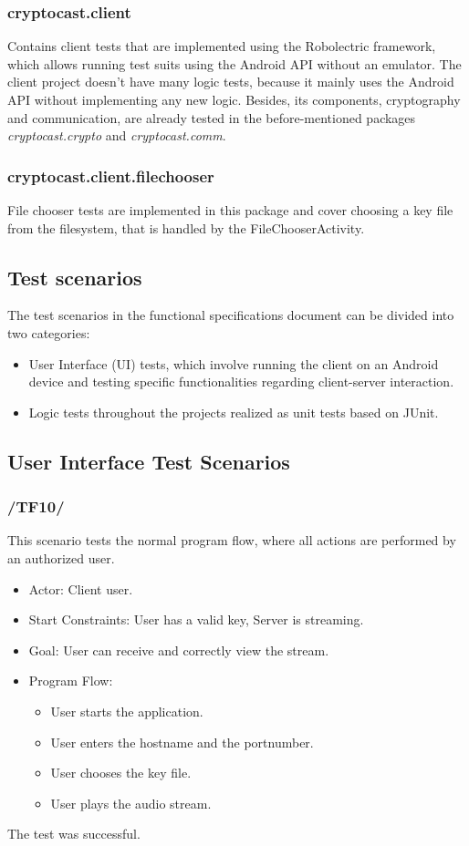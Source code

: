 \documentclass[a4paper,10pt]{scrartcl}
\begin{document}
\subsubsection{cryptocast.client}
Contains client tests that are implemented using the Robolectric framework, which allows running test suits using the Android API without an emulator. The client project doesn't have many logic tests, because it mainly uses the Android API without implementing any new logic. Besides, its components, cryptography and communication, are already tested in the before-mentioned packages \textit{cryptocast.crypto} and \textit{cryptocast.comm}.

\subsubsection{cryptocast.client.filechooser}
File chooser tests are implemented in this package and cover choosing a key file from the filesystem, that is handled by the FileChooserActivity.


\subsection{Test scenarios}
The test scenarios in the functional specifications document can be divided into two categories:

\begin{itemize}
	\item User Interface (UI) tests, which involve running the client on an Android device and testing specific functionalities regarding client-server interaction.
	\item Logic tests throughout the projects realized as unit tests based on JUnit. 
\end{itemize}

\subsection{User Interface Test Scenarios}

\subsubsection{/TF10/}
This scenario tests the normal program flow, where all actions are performed by an authorized user.

\begin{itemize}
	\item Actor: Client user.
	\item Start Constraints: User has a valid key, Server is streaming.
	\item Goal: User can receive and correctly view the stream.
	\item Program Flow:
	\begin{itemize}
   \item User starts the application.
   \item User enters the hostname and the portnumber.
   \item User chooses the key file.
   \item User plays the audio stream.
\end{itemize}
\end{itemize}
The test was successful.
\end{document}
